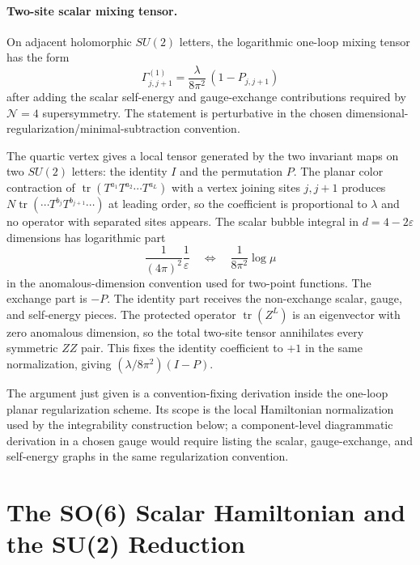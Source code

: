 \paragraph{Two-site scalar mixing tensor.}
On adjacent holomorphic \(SU(2)\) letters, the logarithmic one-loop mixing
tensor has the form
\[
  \Gamma_{j,j+1}^{(1)}
  =
  \frac{\lambda}{8\pi^2}\,(1-P_{j,j+1})
\]
after adding the scalar self-energy and gauge-exchange contributions required
by \(\mathcal N=4\) supersymmetry.  The statement is perturbative in the
chosen dimensional-regularization/minimal-subtraction convention.

The quartic vertex gives a local tensor generated by the two invariant maps
on two \(SU(2)\) letters: the identity \(I\) and the permutation \(P\).  The
planar color contraction of
\(\operatorname{tr}(T^{a_1}T^{a_2}\cdots T^{a_L})\) with a vertex joining
sites \(j,j+1\) produces \(N\operatorname{tr}(\cdots T^{b_j}T^{b_{j+1}}\cdots)\)
at leading order, so the coefficient is proportional to \(\lambda\) and no
operator with separated sites appears.  The scalar bubble integral in
\(d=4-2\varepsilon\) dimensions has logarithmic part
\[
  \frac{1}{(4\pi)^2}\frac{1}{\varepsilon}
  \quad\Longleftrightarrow\quad
  \frac{1}{8\pi^2}\log\mu
\]
in the anomalous-dimension convention used for two-point functions.  The
exchange part is \(-P\).  The identity part receives the non-exchange scalar,
gauge, and self-energy pieces.  The protected operator
\(\operatorname{tr}(Z^L)\) is an eigenvector with zero anomalous dimension,
so the total two-site tensor annihilates every symmetric \(ZZ\) pair.  This
fixes the identity coefficient to \(+1\) in the same normalization, giving
\((\lambda/8\pi^2)(I-P)\).

The argument just given is a convention-fixing derivation inside the
one-loop planar regularization scheme.  Its scope is the local Hamiltonian
normalization used by the integrability construction below; a component-level
diagrammatic derivation in a chosen gauge would require listing the scalar,
gauge-exchange, and self-energy graphs in the same regularization convention.

\section{The SO(6) Scalar Hamiltonian and the SU(2) Reduction}

